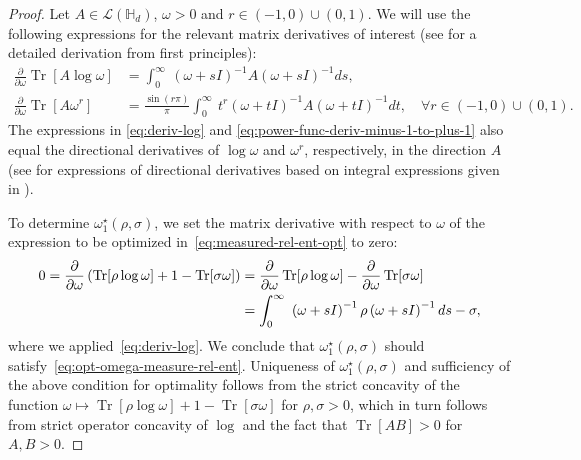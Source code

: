 \documentclass[10pt,a4paper]{amsart}
\newcommand{\HH}{\mathbb{H}}
\DeclareMathOperator{\Tr}{Tr}
\newcommand{\cL}{\mathcal{L}}
\begin{document}
\begin{proof}
Let $A \in \cL(\HH_d)$, $\omega>0$ and $r\in\left(-1,0\right)\cup\left(0,1\right)$. We will use the following expressions  for the relevant matrix derivatives of interest  (see \cite{wilde2025-QIM} for a detailed derivation from first principles):  
\begin{align}
\frac{\partial}{\partial \omega}\Tr[A\log \omega] & =\int_{0}^{\infty}\ \left(\omega+sI\right)^{-1}A\left(\omega+sI\right)^{-1}ds,\label{eq:deriv-log}\\
\frac{\partial}{\partial \omega}\Tr[A\omega^{r}] & =\frac{\sin(r\pi)}{\pi}\int_{0}^{\infty}\ t^{r}\left(\omega+tI\right)^{-1}A\left(\omega+tI\right)^{-1}dt, \quad \forall r\in\left(-1,0\right)\cup\left(0,1\right).\label{eq:power-func-deriv-minus-1-to-plus-1}
\end{align}
The expressions in \eqref{eq:deriv-log} and \eqref{eq:power-func-deriv-minus-1-to-plus-1} also equal the  directional derivatives of $\log \omega$ and $\omega^r$, respectively, in the direction $A$ (see \cite[Proof of Theorem 1 and 5]{SB-IT-2025} for expressions of directional derivatives based on integral expressions given in \cite[Lemma 2.8]{Carlen-2010}). 


To determine  $\omega_{1}^{\star}(\rho,\sigma)$,
we set the matrix derivative  with respect to $\omega$ of the expression to be optimized in~\eqref{eq:measured-rel-ent-opt} to zero:
\begin{align}
0=\frac{\partial}{\partial\omega}\left(\Tr[\rho\log\omega]+1-\Tr[\sigma\omega]\right) & =\frac{\partial}{\partial\omega}\Tr[\rho\log\omega]-\frac{\partial}{\partial\omega}\Tr[\sigma\omega] \notag\\
 & =\int_{0}^{\infty}\ \left(\omega+sI\right)^{-1}\rho\left(\omega+sI\right)^{-1}ds-\sigma, \notag
\end{align}
where we applied~\eqref{eq:deriv-log}. We conclude that  $\omega_{1}^{\star}(\rho,\sigma)$ should satisfy~\eqref{eq:opt-omega-measure-rel-ent}. 
Uniqueness of $\omega_{1}^{\star}(\rho,\sigma)$ and sufficiency of the above condition for optimality follows from the strict concavity of the function $\omega\mapsto\Tr[\rho\log\omega]+1-\Tr[\sigma\omega]$
for $\rho,\sigma>0$,  which in turn follows from strict operator concavity of $\log $ and the fact that $\Tr[AB]> 0$ for $A,B >0$. 


\end{proof}
\end{document}
